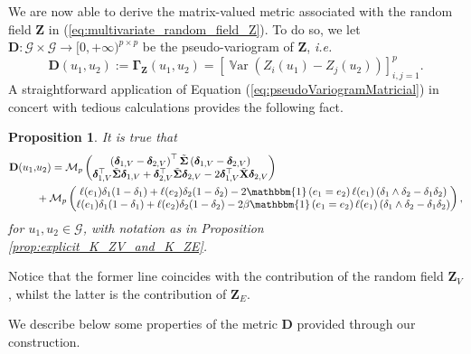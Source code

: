 \documentclass[12pt]{article}
\theoremstyle{plain}
\newtheorem{proposition}{Proposition}
\theoremstyle{remark}
\newcommand{\round}[1]{\left( #1 \right)}
\renewcommand{\square}[1]{\left[ #1\right]}
\newcommand{\indOne}[0]{\mathbbm{1}}
\newcommand{\Mv}[3]{\mathcal{M}_{#1}\begin{pmatrix}
	#2\\
	#3
\end{pmatrix}}
\newcommand{\ie}{\textit{i.e. }}
\newcommand{\latMatr}[1]{\mathbf{#1}}          %
\newcommand{\grMatr}[1]{{\boldsymbol{#1}}}   %
\newcommand{\rVec}[1]{{\bm{#1}}}            %
\DeclareMathOperator{\Var}{\mathbb{V}ar}
\begin{document}
    We are now able to derive the matrix-valued metric associated with the {random field} $\rVec{Z}$ in (\ref{eq:multivariate_random_field_Z}).   To do so, we let  
    $\latMatr{D}: \mathcal G \times \mathcal G \to {[0,+\infty)}^{p \times p}$ be the pseudo-variogram of $\rVec{Z}$, \ie
    \begin{equation}
        \label{eq:definitionOfDistance}     
        \latMatr{D}(u_1,u_2):=\grMatr \Gamma_{\rVec{Z}}(u_1,u_2)=\square{\Var\round{Z_i(u_1)-Z_j(u_2)}}_{i,j=1}^p.
    \end{equation}
    A straightforward application of Equation (\ref{eq:pseudoVariogramMatricial}) in concert with tedious calculations provides the following fact.
    \begin{proposition}
        \label{prop:explicitWritingMultivMetric}
        It is true that
        \begin{align}
            \label{eq:explicitWritingMultivMetric}
            \latMatr{D}(u_1,&u_2)=\Mv{p}{\round{\boldsymbol{\delta}_{ {1,V}}-\boldsymbol{\delta}_{ {2,V}}}^\top \Tilde {\grMatr{\Sigma}} \round{\boldsymbol{\delta}_{ {1,V}}-\boldsymbol{\delta}_{ {2,V}}}}{\boldsymbol{\delta}_{ {1,V}}^\top \Tilde {\grMatr{\Sigma}} \boldsymbol{\delta}_{ {1,V}} + \boldsymbol{\delta}_{ {2,V}}^\top \Tilde {\grMatr{\Sigma}} \boldsymbol{\delta}_{ {2,V}}-2\boldsymbol{\delta}_{ {1,V}}^\top \Tilde {\latMatr{X}} \boldsymbol{\delta}_{ {2,V}}}\nonumber\\
            &+\Mv{p}{\ell(e_1) \delta_1(1-\delta_1)+\ell(e_2)\delta_2(1-\delta_2) - 2\indOne \round{e_1=e_2}\ell(e_1)\round{\delta_1 \wedge \delta_2 - \delta_1 \delta_2}}{\ell(e_1) \delta_1(1-\delta_1)+\ell(e_2)\delta_2(1-\delta_2) - 2\beta \indOne\round{e_1=e_2} \ell(e_1)\round{\delta_1 \wedge \delta_2 - \delta_1 \delta_2}},
        \end{align}
        for $u_1,u_2 \in \mathcal G$, with notation as in Proposition \ref{prop:explicit_K_ZV_and_K_ZE}.
    \end{proposition}    
    Notice that the former line coincides with the contribution of the  {random field} $\boldsymbol{Z}_V$, whilst the latter is the contribution of $\boldsymbol{Z}_E$. 

    We describe below some properties of the metric $\latMatr{D}$ provided through our construction. 
\end{document}
